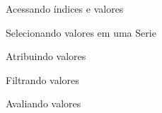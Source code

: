 \begin{frame}[t, fragile]{Acessando índices e valores}
    
\end{frame}
%
\begin{frame}[t, fragile]{Selecionando valores em uma Serie}
    
\end{frame}
%
\begin{frame}[t, fragile]{Atribuindo valores}
    
\end{frame}
%
\begin{frame}[t, fragile]{Filtrando valores}
    
\end{frame}
%
\begin{frame}{Avaliando valores}
    
\end{frame}
%
